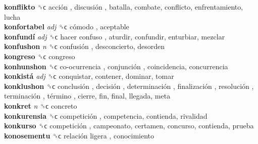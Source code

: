 \textbf{konflikto} ␝ϲ   acción ,  discusión , batalla, combate, conflicto, enfrentamiento, lucha  \\
\textbf{konfortabel} \emph{adj}  ␝ϲ   cómodo , aceptable  \\
\textbf{konfundí} \emph{adj}  ␝ϲ   hacer confuso , aturdir, confundir, enturbiar, mezclar  \\
\textbf{konfushon} \emph{n}  ␝ϲ   confusión , desconcierto, desorden  \\
\textbf{kongreso} ␝ϲ  congreso  \\
\textbf{konhunshon} ␝ϲ   co-ocurrencia ,  conjunción , coincidencia, concurrencia  \\
\textbf{konkistá} \emph{adj}  ␝ϲ  conquistar, contener, dominar, tomar  \\
\textbf{konklushon} ␝ϲ   conclusión ,  decisión ,  determinación ,  finalización ,  resolución ,  terminación ,  término , cierre, fin, final, llegada, meta  \\
\textbf{konkret} \emph{n}  ␝ϲ  concreto  \\
\textbf{konkurensia} ␝ϲ   competición , competencia, contienda, rivalidad  \\
\textbf{konkurso} ␝ϲ   competición , campeonato, certamen, concurso, contienda, prueba  \\
\textbf{konosementu} ␝ϲ   relación ligera , conocimiento  \\
